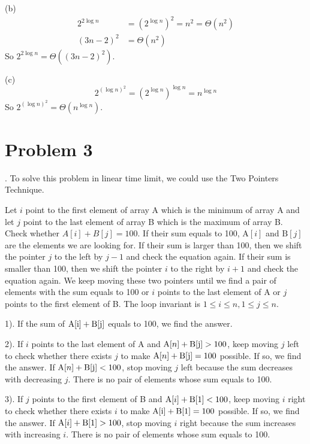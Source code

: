 \documentclass[twoside,11pt]{homework}
\begin{document}
\noindent (b)
%
\begin{equation}
\begin{split}
2^{2\log n} &= (2^{\log n})^2 = n^2 = \Theta(n^2) \\
(3n - 2)^2 &= \Theta(n^2)
\end{split}
\end{equation}
%
So $2^{2\log n} = \Theta((3n-2)^2)$.

\noindent (c)
%
\begin{equation}
2^{(\log n)^2} = (2^{\log n})^{\log n} = n^{\log n}
\end{equation}
%
So $2^{(\log n)^2} = \Theta (n^{\log n})$.


\section*{Problem 3}
.
To solve this problem in linear time limit, we could use the Two Pointers Technique. 

Let $i$ point to the first element of array A which is the minimum of array A and let $j$ point to the last element of array B which is the maximum of array B. 
Check whether $A[i] + B[j] = 100$. 
If their sum equals to 100, $\mathrm{A}[i]$ and $\mathrm{B}[j]$ are the elements we are looking for.
If their sum is larger than 100, then we shift the pointer $j$ to the left by $j - 1$ and check the equation again. 
If their sum is smaller than 100, then we shift the pointer $i$ to the right by $i + 1$ and check the equation again. 
We keep moving these two pointers until we find a pair of elements with the sum equals to 100 or $i$ points to the last element of A or $j$ points to the first element of B.
The loop invariant is $1 \le i \le n, 1 \le j \le n$.

1). If the sum of $\rm{A}[i] + \rm{B}[j]$ equals to 100,  we find the answer. 


2). If $i$ points to the last element of A and $\mathrm{A}[n] + \rm{B}[j]  > 100$, keep moving $j$ left to check whether there exists $j$ to make $\mathrm{A}[n] + \rm{B}[j] =100$ possible. If so, we find the answer. 
If $\mathrm{A}[n] + \rm{B}[j]  < 100$, stop moving $j$ left because the sum decreases with decreasing $j$.
There is no pair of elements whose sum equals to 100.

3). If $j$ points to the first element of B and $\mathrm{A}[i] + \rm{B}[1] < 100$, keep moving $i$ right to check whether there exists $i$ to make $\rm{A}[i] + \rm{B}[1] = 100$ possible. If so, we find the answer. 
If $\mathrm{A}[i] + \rm{B}[1]  > 100$, stop moving $i$ right because the sum increases with increasing $i$.
There is no pair of elements whose sum equals to 100.
\end{document}
